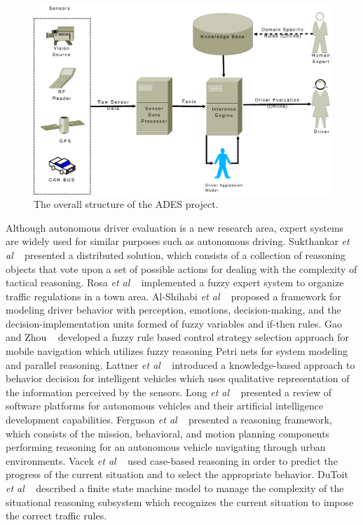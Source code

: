 \documentclass[letterpaper, 10 pt, conference]{ieeeconf}
\begin{document}
\begin{figure}[thb]
      \centering
      \includegraphics[scale=0.16]{img/sys3}
      \caption{The overall structure of the ADES project.}
      \label{fig:sys}
\end{figure}

Although autonomous driver evaluation is a new research area, expert systems are widely used for similar purposes such as autonomous driving. Sukthankar \textit{et al}  ~\cite{Sukthankar97} presented a distributed solution, which consists of a collection of reasoning objects that vote upon a set of possible actions for dealing with the complexity of tactical reasoning. Rosa \textit{et al} ~\cite{Rosa97} implemented a fuzzy expert system to organize traffic regulations in a town area. Al-Shihabi \textit{et al} ~\cite{Shihabi01}  proposed a framework for modeling driver behavior with perception, emotions, decision-making, and the decision-implementation units formed of fuzzy variables and if-then rules.  Gao and Zhou  ~\cite{Gao05} developed a fuzzy rule based control strategy selection approach for mobile navigation which utilizes fuzzy reasoning Petri nets for system modeling and parallel reasoning. Lattner \textit{et al} ~\cite{Lattner05} introduced a knowledge-based approach to behavior decision for intelligent vehicles which uses qualitative representation of the information perceived by the sensors. Long \textit{et al} ~\cite{Long07} presented a review of software platforms for autonomous vehicles and their artificial intelligence development capabilities. Ferguson \textit{et al} ~\cite{Ferguson08} presented a reasoning framework, which consists of the mission, behavioral, and motion planning components performing reasoning for an autonomous vehicle navigating through urban environments. Vacek \textit{et al} ~\cite{Vacek07} used case-based reasoning in order to predict the progress of the current situation and to select the appropriate behavior. DuToit \textit{et al} ~\cite{Dutoit08} described a finite state machine model to manage the complexity of the situational reasoning subsystem which recognizes the current situation to impose the correct traffic rules.
\end{document}
